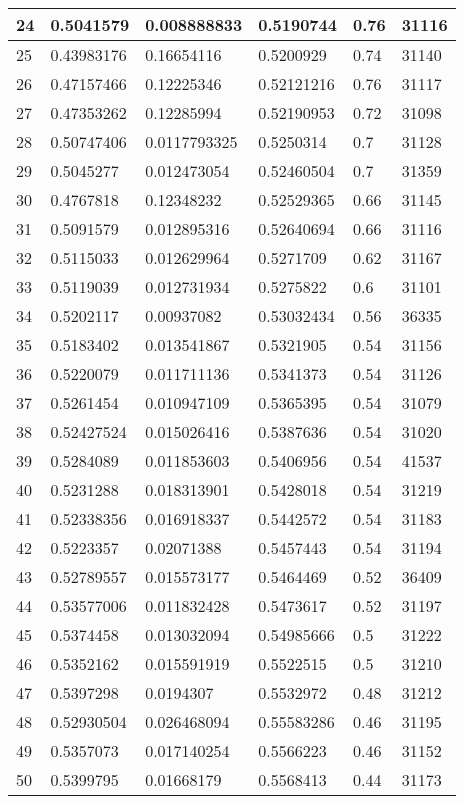 \begin{longtable}{|l|l|l|l|l|l|}
24 & 0.5041579 & 0.008888833 & 0.5190744 & 0.76 & 31116 \\ \hline 
25 & 0.43983176 & 0.16654116 & 0.5200929 & 0.74 & 31140 \\ \hline 
26 & 0.47157466 & 0.12225346 & 0.52121216 & 0.76 & 31117 \\ \hline 
27 & 0.47353262 & 0.12285994 & 0.52190953 & 0.72 & 31098 \\ \hline 
28 & 0.50747406 & 0.0117793325 & 0.5250314 & 0.7 & 31128 \\ \hline 
29 & 0.5045277 & 0.012473054 & 0.52460504 & 0.7 & 31359 \\ \hline 
30 & 0.4767818 & 0.12348232 & 0.52529365 & 0.66 & 31145 \\ \hline 
31 & 0.5091579 & 0.012895316 & 0.52640694 & 0.66 & 31116 \\ \hline 
32 & 0.5115033 & 0.012629964 & 0.5271709 & 0.62 & 31167 \\ \hline 
33 & 0.5119039 & 0.012731934 & 0.5275822 & 0.6 & 31101 \\ \hline 
34 & 0.5202117 & 0.00937082 & 0.53032434 & 0.56 & 36335 \\ \hline 
35 & 0.5183402 & 0.013541867 & 0.5321905 & 0.54 & 31156 \\ \hline 
36 & 0.5220079 & 0.011711136 & 0.5341373 & 0.54 & 31126 \\ \hline 
37 & 0.5261454 & 0.010947109 & 0.5365395 & 0.54 & 31079 \\ \hline 
38 & 0.52427524 & 0.015026416 & 0.5387636 & 0.54 & 31020 \\ \hline 
39 & 0.5284089 & 0.011853603 & 0.5406956 & 0.54 & 41537 \\ \hline 
40 & 0.5231288 & 0.018313901 & 0.5428018 & 0.54 & 31219 \\ \hline 
41 & 0.52338356 & 0.016918337 & 0.5442572 & 0.54 & 31183 \\ \hline 
42 & 0.5223357 & 0.02071388 & 0.5457443 & 0.54 & 31194 \\ \hline 
43 & 0.52789557 & 0.015573177 & 0.5464469 & 0.52 & 36409 \\ \hline 
44 & 0.53577006 & 0.011832428 & 0.5473617 & 0.52 & 31197 \\ \hline 
45 & 0.5374458 & 0.013032094 & 0.54985666 & 0.5 & 31222 \\ \hline 
46 & 0.5352162 & 0.015591919 & 0.5522515 & 0.5 & 31210 \\ \hline 
47 & 0.5397298 & 0.0194307 & 0.5532972 & 0.48 & 31212 \\ \hline 
48 & 0.52930504 & 0.026468094 & 0.55583286 & 0.46 & 31195 \\ \hline 
49 & 0.5357073 & 0.017140254 & 0.5566223 & 0.46 & 31152 \\ \hline 
50 & 0.5399795 & 0.01668179 & 0.5568413 & 0.44 & 31173 \\ \hline 
\end{longtable}